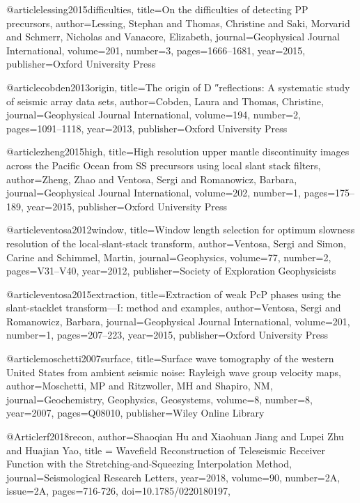 @article{lessing2015difficulties,
  title={On the difficulties of detecting PP precursors},
  author={Lessing, Stephan and Thomas, Christine and Saki, Morvarid and Schmerr, Nicholas and Vanacore, Elizabeth},
  journal={Geophysical Journal International},
  volume={201},
  number={3},
  pages={1666--1681},
  year={2015},
  publisher={Oxford University Press}
}

@article{cobden2013origin,
  title={The origin of D ″reflections: A systematic study of seismic array data sets},
  author={Cobden, Laura and Thomas, Christine},
  journal={Geophysical Journal International},
  volume={194},
  number={2},
  pages={1091--1118},
  year={2013},
  publisher={Oxford University Press}
}


@article{zheng2015high,
  title={High resolution upper mantle discontinuity images across the Pacific Ocean from SS precursors using local slant stack filters},
  author={Zheng, Zhao and Ventosa, Sergi and Romanowicz, Barbara},
  journal={Geophysical Journal International},
  volume={202},
  number={1},
  pages={175--189},
  year={2015},
  publisher={Oxford University Press}
}

@article{ventosa2012window,
  title={Window length selection for optimum slowness resolution of the local-slant-stack transform},
  author={Ventosa, Sergi and Simon, Carine and Schimmel, Martin},
  journal={Geophysics},
  volume={77},
  number={2},
  pages={V31--V40},
  year={2012},
  publisher={Society of Exploration Geophysicists}
}

@article{ventosa2015extraction,
  title={Extraction of weak PcP phases using the slant-stacklet transform—I: method and examples},
  author={Ventosa, Sergi and Romanowicz, Barbara},
  journal={Geophysical Journal International},
  volume={201},
  number={1},
  pages={207--223},
  year={2015},
  publisher={Oxford University Press}
}

@article{moschetti2007surface,
  title={Surface wave tomography of the western United States from ambient seismic noise: Rayleigh wave group velocity maps},
  author={Moschetti, MP and Ritzwoller, MH and Shapiro, NM},
  journal={Geochemistry, Geophysics, Geosystems},
  volume={8},
  number={8},
  year={2007},
  pages={Q08010},
  publisher={Wiley Online Library}
}

@Article{rf2018recon,
  author={Shaoqian Hu and Xiaohuan Jiang and Lupei Zhu and Huajian Yao},
  title = {Wavefield Reconstruction of Teleseismic Receiver Function with the Stretching‐and‐Squeezing Interpolation Method},
  journal={Seismological Research Letters},
  year=2018,
  volume=90,
  number=2A,
  issue=2A,
  pages={716-726},
  doi={10.1785/0220180197},
}

